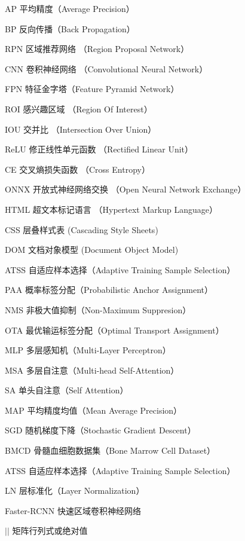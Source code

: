 
\begin{denotation}[3cm]
  \item[AP] 平均精度（Average Precision）
  \item[BP] 反向传播（Back Propagation）
  \item[RPN] 区域推荐网络 （Region Proposal Network）
  \item[CNN] 卷积神经网络 （Convolutional Neural Network）
  \item[FPN] 特征金字塔（Feature Pyramid Network）
  \item[ROI] 感兴趣区域 （Region Of Interest）
  \item[IOU] 交并比 （Intersection Over Union）
  \item[ReLU] 修正线性单元函数 （Rectified Linear Unit）
  \item[CE] 交叉熵损失函数 （Cross Entropy）
  \item[ONNX] 开放式神经网络交换 （Open Neural Network Exchange）
  \item[HTML] 超文本标记语言 （Hypertext Markup Language）
  \item[CSS] 层叠样式表 (Cascading Style Sheets)
  \item[DOM] 文档对象模型 (Document Object Model)
  \item[ATSS] 自适应样本选择（Adaptive Training Sample Selection）
  \item[PAA] 概率标签分配（Probabilistic Anchor Assignment）
  \item[NMS] 非极大值抑制（Non-Maximum Suppresion）
  \item[OTA] 最优输运标签分配（Optimal Transport Assignment）
  \item[MLP] 多层感知机（Multi-Layer Perceptron）
  \item[MSA] 多层自注意（Multi-head Self-Attention）
  \item[SA] 单头自注意（Self Attention）
  \item[MAP] 平均精度均值（Mean Average Precision）
  \item[SGD] 随机梯度下降（Stochastic Gradient Descent）
  \item[BMCD] 骨髓血细胞数据集（Bone Marrow Cell Dataset）
  \item[ATSS] 自适应样本选择（Adaptive Training Sample Selection）
  \item[LN] 层标准化（Layer Normalization） 
  \item[Faster-RCNN] 快速区域卷积神经网络
  \item[$\left| {} \right|$] 矩阵行列式或绝对值
\end{denotation}



